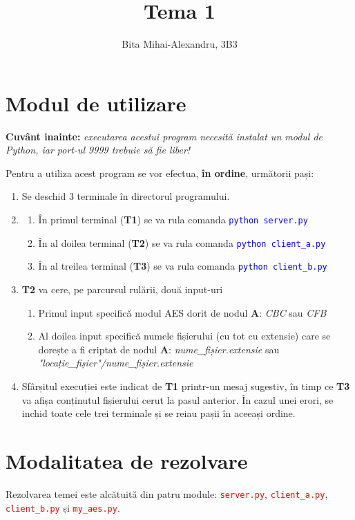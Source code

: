 \documentclass{article}
\author{Bita Mihai-Alexandru, 3B3}
\title{Tema 1}
\begin{document}
\maketitle

\section{Modul de utilizare}
\textbf{Cuvânt inainte: }\emph{executarea acestui program necesită instalat un modul de Python\cite{Python}, iar port-ul 9999 trebuie să fie liber!}\par
Pentru a utiliza acest program se vor efectua, \textbf{în ordine}, următorii pași:
\begin{enumerate}
\item Se deschid 3 terminale în directorul programului.
\item
\begin{enumerate}
\item În primul terminal (\textbf{T1}) se va rula comanda \textcolor{blue}{\lstinline{python server.py}}
\item În al doilea terminal (\textbf{T2}) se va rula comanda \textcolor{blue}{\lstinline{python client_a.py}}
\item În al treilea terminal (\textbf{T3}) se va rula comanda \textcolor{blue}{\lstinline{python client_b.py}}
\end{enumerate}
\item \textbf{T2} va cere, pe parcursul rulării, două input-uri
\begin{enumerate}
\item Primul input specifică modul AES dorit de nodul \textbf{A}: \emph{CBC} sau \emph{CFB}
\item Al doilea input specifică numele fișierului (cu tot cu extensie) care se dorește a fi criptat de nodul \textbf{A}: \emph{nume\_fișier.extensie} sau \emph{"locație\_fișier"/nume\_fișier.extensie}
\end{enumerate}
\item Sfârșitul execuției este indicat de \textbf{T1} printr-un mesaj sugestiv, în timp ce \textbf{T3} va afișa conținutul fișierului cerut la pasul anterior. În cazul unei erori, se inchid toate cele trei terminale și se reiau pașii în aceeași ordine.
\end{enumerate}

\section{Modalitatea de rezolvare}
Rezolvarea temei este alcătuită din patru module: \textcolor{red}{\lstinline{server.py}}, \textcolor{red}{\lstinline{client_a.py}}, \textcolor{red}{\lstinline{client_b.py}} și \textcolor{red}{\lstinline{my_aes.py}}.\par
\end{document}
